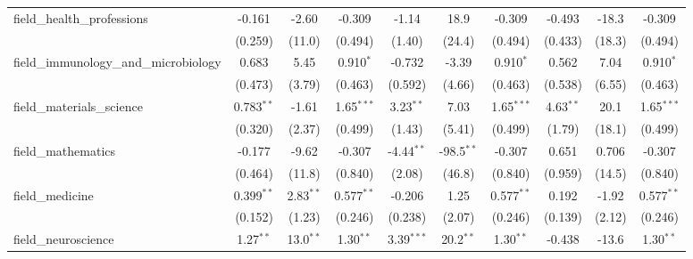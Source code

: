 \begin{tabular}{lccccccccc}
   field\_health\_professions                                  & -0.161         & -2.60          & -0.309        & -1.14         & 18.9           & -0.309        & -0.493         & -18.3         & -0.309\\   
                                                               & (0.259)        & (11.0)         & (0.494)       & (1.40)        & (24.4)         & (0.494)       & (0.433)        & (18.3)        & (0.494)\\   
   field\_immunology\_and\_microbiology                        & 0.683          & 5.45           & 0.910$^{*}$   & -0.732        & -3.39          & 0.910$^{*}$   & 0.562          & 7.04          & 0.910$^{*}$\\   
                                                               & (0.473)        & (3.79)         & (0.463)       & (0.592)       & (4.66)         & (0.463)       & (0.538)        & (6.55)        & (0.463)\\   
   field\_materials\_science                                   & 0.783$^{**}$   & -1.61          & 1.65$^{***}$  & 3.23$^{**}$   & 7.03           & 1.65$^{***}$  & 4.63$^{**}$    & 20.1          & 1.65$^{***}$\\   
                                                               & (0.320)        & (2.37)         & (0.499)       & (1.43)        & (5.41)         & (0.499)       & (1.79)         & (18.1)        & (0.499)\\   
   field\_mathematics                                          & -0.177         & -9.62          & -0.307        & -4.44$^{**}$  & -98.5$^{**}$   & -0.307        & 0.651          & 0.706         & -0.307\\   
                                                               & (0.464)        & (11.8)         & (0.840)       & (2.08)        & (46.8)         & (0.840)       & (0.959)        & (14.5)        & (0.840)\\   
   field\_medicine                                             & 0.399$^{**}$   & 2.83$^{**}$    & 0.577$^{**}$  & -0.206        & 1.25           & 0.577$^{**}$  & 0.192          & -1.92         & 0.577$^{**}$\\   
                                                               & (0.152)        & (1.23)         & (0.246)       & (0.238)       & (2.07)         & (0.246)       & (0.139)        & (2.12)        & (0.246)\\   
   field\_neuroscience                                         & 1.27$^{**}$    & 13.0$^{**}$    & 1.30$^{**}$   & 3.39$^{***}$  & 20.2$^{**}$    & 1.30$^{**}$   & -0.438         & -13.6         & 1.30$^{**}$\\   

\end{tabular}
